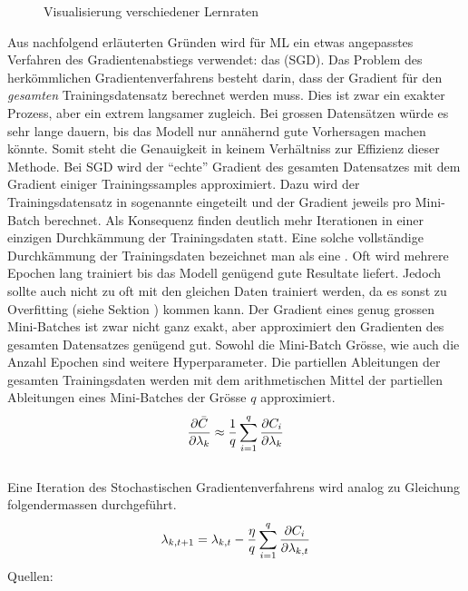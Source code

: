 \begin{figure}[h!]
  \centering
  \caption{Visualisierung verschiedener Lernraten}
\end{figure}

Aus nachfolgend erläuterten Gründen wird für ML ein etwas angepasstes
Verfahren des Gradientenabstiegs verwendet: das  (SGD).
Das Problem des herkömmlichen Gradientenverfahrens besteht darin, dass der
Gradient für den \textit{gesamten} Trainingsdatensatz berechnet werden muss.
Dies ist zwar ein exakter Prozess, aber ein extrem langsamer zugleich.
Bei grossen Datensätzen würde es sehr lange dauern, bis das Modell nur annähernd gute Vorhersagen machen könnte.
Somit steht die Genauigkeit in keinem Verhältniss zur Effizienz dieser Methode.
\para{}
Bei SGD wird der ``echte'' Gradient des gesamten Datensatzes mit dem Gradient einiger Trainingssamples approximiert.
Dazu wird der Trainingsdatensatz in sogenannte  eingeteilt und der Gradient jeweils pro Mini-Batch berechnet.
Als Konsequenz finden deutlich mehr Iterationen in einer einzigen
Durchkämmung der Trainingsdaten statt. Eine solche vollständige Durchkämmung der Trainingsdaten
bezeichnet man als eine .
Oft wird mehrere Epochen lang trainiert bis das Modell genügend gute Resultate
liefert. Jedoch sollte auch nicht zu oft mit den gleichen Daten trainiert
werden, da es sonst zu Overfitting (siehe Sektion ) kommen kann.
Der Gradient eines genug grossen Mini-Batches ist zwar nicht ganz exakt, aber
approximiert den Gradienten des gesamten Datensatzes genügend gut.
Sowohl die Mini-Batch Grösse, wie auch die Anzahl Epochen sind weitere Hyperparameter.
\para{}
Die partiellen Ableitungen der gesamten Trainingsdaten werden mit dem
arithmetischen Mittel der partiellen Ableitungen eines Mini-Batches der Grösse $q$ approximiert.
\\
\begin{equation}\label{eq:minibatch_deriv}
  \frac{\partial \bar{C}}{\partial \lambda_k} \approx \frac{1}{q}\sum_{i=1}^{q} \frac{\partial C_i}{\partial \lambda_k}
\end{equation}
\\
Eine Iteration des Stochastischen Gradientenverfahrens wird analog zu Gleichung  folgendermassen durchgeführt.
\\
\begin{equation}\label{eq:sgd}
  \lambda_{k,t+1} = \lambda_{k,t} - \frac{\eta}{q} \sum_{i=1}^{q} \frac{\partial C_i}{\partial \lambda_{k,t}}
\end{equation}
\para{}
Quellen: \cite{Nielsen} \cite{book:hands-on}

